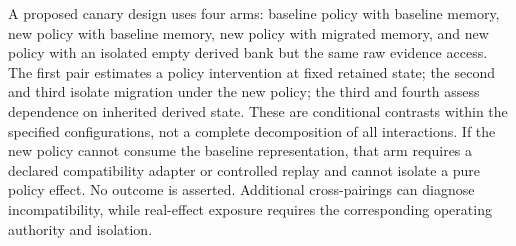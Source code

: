 A proposed canary design uses four arms: baseline policy with baseline memory, new policy with baseline memory, new policy with migrated memory, and new policy with an isolated empty derived bank but the same raw evidence access. The first pair estimates a policy intervention at fixed retained state; the second and third isolate migration under the new policy; the third and fourth assess dependence on inherited derived state. These are conditional contrasts within the specified configurations, not a complete decomposition of all interactions. If the new policy cannot consume the baseline representation, that arm requires a declared compatibility adapter or controlled replay and cannot isolate a pure policy effect. No outcome is asserted. Additional cross-pairings can diagnose incompatibility, while real-effect exposure requires the corresponding operating authority and isolation.

